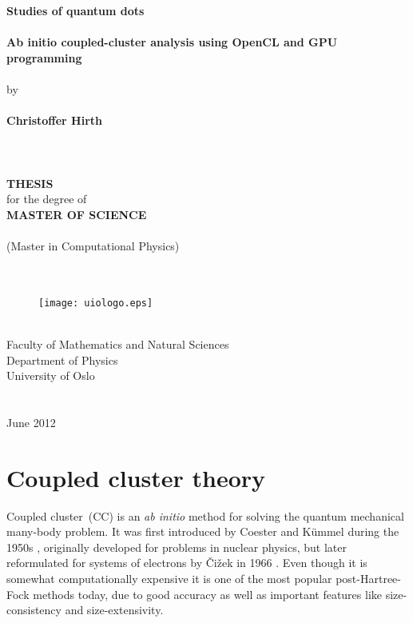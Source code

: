\begin{titlepage}
\begin{center}
{\huge \bf Studies of quantum dots}\\
\ \\
{\Large \bf Ab initio coupled-cluster analysis using OpenCL and GPU programming}\\ 
\ \\ 
{\Large by}\\
\ \\
{\Large \bf Christoffer Hirth}\\
\ \\
\ \\
\ \\
{\large \bf THESIS}\\
{\large for the degree of}\\
{\large \bf MASTER OF SCIENCE}\\
\ \\
(Master in Computational Physics)\\
\ \\
\ \\
\begin{figure}[h!]
\begin{center}
\texttt{[image: uiologo.eps]}
\end{center}
\end{figure}
\ \\
\Large{\rm Faculty of Mathematics and Natural Sciences}\\
{\rm Department of Physics}\\
{\rm University of Oslo}\\
\ \\
\ \\
{\rm June 2012}
\end{center}
\end{titlepage}
\chapter{Coupled cluster theory}
Coupled cluster~(CC) is an \textit{ab initio} method for solving the quantum mechanical many-body problem.
It was first introduced by Coester and Kümmel during the 1950s \cite{NucPhys.7.421,NucPhys.17.477},
originally developed for problems in nuclear physics, but later reformulated for systems of electrons by \v{C}i\v{z}ek in 1966 \cite{ChemPhys.45.4256}.
Even though it is somewhat computationally expensive it is one of the most popular post-Hartree-Fock methods today, due to good accuracy as well as important features like size-consistency and size-extensivity.


